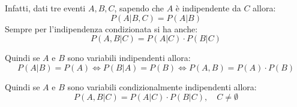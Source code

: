 Infatti, dati tre eventi $A, B, C$, sapendo che $A$ è indipendente da $C$ allora:
\begin{equation*}
    P(A | B, C) = P(A | B)
\end{equation*}
Sempre per l'indipendenza condizionata si ha anche:
\begin{equation*}
    P(A, B | C) = P(A | C) \cdot P(B | C)
\end{equation*}
\begin{nota}
    Quindi se $A$ e $B$ sono variabili indipendenti allora:
    \begin{equation*}
        P(A|B) = P(A) \iff P(B|A) = P(B) \iff P(A,B) = P(A)\cdot P(B)
    \end{equation*}
\end{nota}
\begin{nota}
    Quindi se $A$ e $B$ sono variabili condizionalmente indipendenti allora:
    \begin{equation*}
        P(A,B|C) = P(A|C) \cdot P(B|C), \quad C \neq \emptyset
    \end{equation*}
\end{nota}